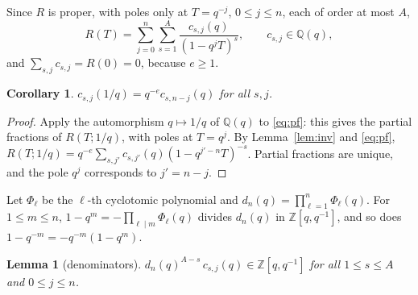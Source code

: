 \documentclass[11pt]{amsart}
\newtheorem{lemma}[theorem]{Lemma}
\newtheorem{corollary}[theorem]{Corollary}
\theoremstyle{definition}
\theoremstyle{remark}
\numberwithin{equation}{section}
\newcommand{\ZZ}{\mathbb{Z}}
\newcommand{\QQ}{\mathbb{Q}}
\begin{document}
Since $R$ is proper, with poles only at $T=q^{-j}$, $0\le j\le n$, each of order at most $A$,
\begin{equation}\label{eq:pf}
R(T)=\sum_{j=0}^n\sum_{s=1}^A\frac{c_{s,j}(q)}{(1-q^jT)^s},\qquad c_{s,j}\in\QQ(q),
\end{equation}
and $\sum_{s,j}c_{s,j}=R(0)=0$, because $e\ge1$.

\begin{corollary}\label{cor:cinv}
$c_{s,j}(1/q)=q^{-e}c_{s,n-j}(q)$ for all $s,j$.
\end{corollary}

\begin{proof}
Apply the automorphism $q\mapsto1/q$ of $\QQ(q)$ to \eqref{eq:pf}: this gives the partial fractions of $R(T;1/q)$, with
poles at $T=q^j$. By Lemma~\ref{lem:inv} and \eqref{eq:pf}, $R(T;1/q)=q^{-e}\sum_{s,j'}c_{s,j'}(q)(1-q^{j'-n}T)^{-s}$.
Partial fractions are unique, and the pole $q^j$ corresponds to $j'=n-j$.
\end{proof}

Let $\Phi_\ell$ be the $\ell$-th cyclotomic polynomial and $d_n(q)=\prod_{\ell=1}^n\Phi_\ell(q)$. For $1\le m\le n$,
$1-q^m=-\prod_{\ell\mid m}\Phi_\ell(q)$ divides $d_n(q)$ in $\ZZ[q,q^{-1}]$, and so does $1-q^{-m}=-q^{-m}(1-q^m)$.

\begin{lemma}[denominators]\label{lem:den}
$d_n(q)^{A-s}\,c_{s,j}(q)\in\ZZ[q,q^{-1}]$ for all $1\le s\le A$ and $0\le j\le n$.
\end{lemma}
\end{document}
